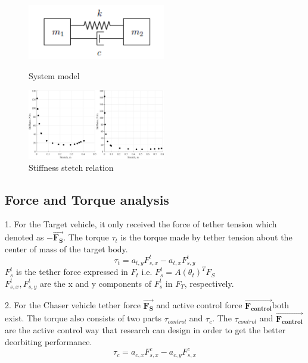 \begin{figure}[htbp]
\centering
\begin{minipage}[t]{0.48\textwidth}
\centering
\includegraphics[width=6cm]{fig/simulation/Systemmodel}
\caption{System model}
\label{simu-systemmodel}
\end{minipage}
\begin{minipage}[t]{0.48\textwidth}
\centering
\includegraphics[width=6cm]{fig/simulation/StiffnessStetchRelation}
\caption{Stiffness stetch relation}
\end{minipage}
\end{figure}

\subsection{Force and Torque analysis}

1. For the Target vehicle, it only received the force of tether tension which denoted as $\mathbf{-\overrightarrow{F_S}}$. The torque $\tau_t$ is the torque made by tether tension about the center of mass of the target body.
\begin{equation}
\tau_t = a_{t,y}F_{s,x}^t - a_{t,x}F_{s,y}^t
\end{equation}
\quad $F_{s}^t$ is the tether force expressed in $F_t$ i.e. $F_{s}^t = A(\theta_t)^TF_S$\\
\quad\quad $F_{s,x}^t,F_{s,y}^t$ are the x and y components of $F_{s}^t$ in $F_T$, respectively.   

2. For the Chaser vehicle tether force $\mathbf{\overrightarrow{F_S}}$ and active control force $\mathbf{\overrightarrow{F_{control}}}$both exist. The torque also consists of two parts $\tau_{control}$ and  $\tau_{c}$. The $\tau_{control}$ and $\mathbf{\overrightarrow{F_{control}}}$ are the active control way that research can design in order to get the better deorbiting performance.
\begin{equation}
\tau_c = a_{c,x}F_{s,x}^c - a_{c,y}F_{s,x}^c
\end{equation}

